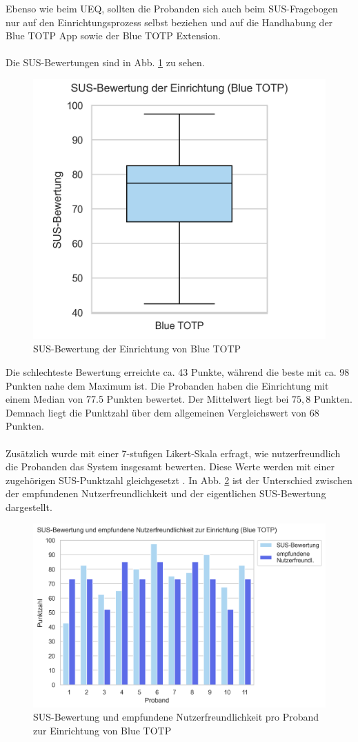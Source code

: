 Ebenso wie beim UEQ, sollten die Probanden sich auch beim SUS-Fragebogen nur 
auf den Einrichtungsprozess selbst beziehen und auf die Handhabung der Blue 
TOTP App sowie der Blue TOTP Extension.
\\\\
Die SUS-Bewertungen sind in Abb. \ref{fig: studie setup sus boxplot} zu sehen. 
\begin{figure}
    \centering
    \includegraphics[width=.5\linewidth]{data_processing/questionaires/results/setup_sus_boxplot.png}
    \caption[SUS-Bewertung der Einrichtung von Blue TOTP]{SUS-Bewertung der Einrichtung von Blue TOTP}
    \label{fig: studie setup sus boxplot}
\end{figure}
Die schlechteste Bewertung erreichte ca. 43 Punkte, während die beste mit ca. 
98 Punkten nahe dem Maximum ist. Die Probanden haben die Einrichtung mit einem 
Median von 77.5 Punkten bewertet. Der Mittelwert liegt bei $75{,}8$ Punkten. 
Demnach liegt die Punktzahl über dem allgemeinen Vergleichswert von 68 Punkten.
\\\\
Zusätzlich wurde mit einer 7-stufigen Likert-Skala erfragt, wie nutzerfreundlich die Probanden das System insgesamt bewerten. Diese Werte werden mit einer zugehörigen SUS-Punktzahl gleichgesetzt \autocite{SUS11}. In Abb. \ref{fig: studie setup sus vs sus11} ist der Unterschied zwischen der empfundenen Nutzerfreundlichkeit und der eigentlichen SUS-Bewertung dargestellt.
\begin{figure}[h]
    \centering
    \includegraphics[width=.8\linewidth]{data_processing/questionaires/results/setup_sus_vs_sus11.png}
    \caption[SUS-Bewertung und empfundene Nutzerfreundlichkeit (Einrichtung Blue TOTP)]{SUS-Bewertung und empfundene Nutzerfreundlichkeit \autocite{SUS11} pro Proband zur Einrichtung von Blue TOTP}
    \label{fig: studie setup sus vs sus11}
\end{figure}

